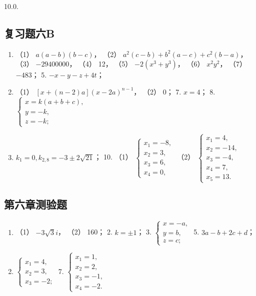 10.0.

\subsection{复习题六B}

\begin{enumerate}
\item
  （1） \(a(a - b)(b - c)\)， （2）
  \(a^2(c - b) + b^2(a - c) + c^2(b - a)\)， （3） \(-29400000\)， （4）
  12， （5） \(-2(x^3 + y^3)\)， （6） \(x^2y^2\)， （7） \(-483\)； 5.
  \(-x - y - z + 4t\)；
\item
  （1） \([x + (n - 2)a](x - 2a)^{n - 1}\)， （2） 0； 7. \(x = 4\)； 8.
  \(\left\{ \begin{array}{l} x = k(a + b + c), \\ y = -k, \\ z = -k; \end{array} \right.\)
\item
  \(k_{1} = 0, k_{2,8} = -3 \pm 2\sqrt{21}\)； 10. （1）
  \(\left\{ \begin{array}{l} x_{1} = -8, \\ x_{2} = 3, \\ x_{3} = 6, \\ x_{4} = 0, \end{array} \right.\)
  （2）
  \(\left\{ \begin{array}{l} x_{1} = 4, \\ x_{2} = -14, \\ x_{3} = -4, \\ x_{4} = 7, \\ x_{5} = 13. \end{array} \right.\)
\end{enumerate}

\subsection{第六章测验题}

\begin{enumerate}
\item
  （1） \(-3\sqrt{3}i\)， （2） 160； 2. \(k = \pm 1\)； 3.
  \(\left\{ \begin{array}{l} x = -a, \\ y = b, \\ z = c; \end{array} \right.\)
  5. \(3a - b + 2c + d\)；
\item
  \(\left\{ \begin{array}{l} x_{1} = 4, \\ x_{2} = 3, \\ x_{3} = -2; \end{array} \right.\)
  7.
  \(\left\{ \begin{array}{l} x_{1} = 1, \\ x_{2} = 2, \\ x_{3} = -1, \\ x_{4} = -2. \end{array} \right.\)
\end{enumerate}

